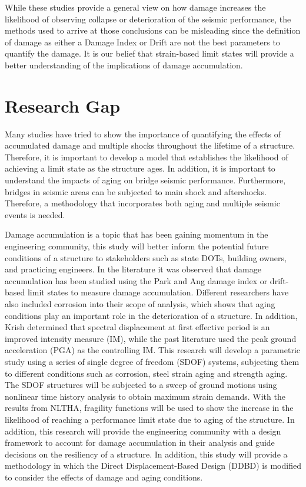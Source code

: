 While these studies provide a general view on how damage increases the likelihood of observing collapse or deterioration of the seismic performance, the methods used to arrive at those conclusions can be misleading since the definition of damage as either a Damage Index or Drift are not the best parameters to quantify the damage. It is our belief that strain-based limit states will provide a better understanding of the implications of damage accumulation.

\section{Research Gap}

Many studies have tried to show the importance of quantifying the effects of accumulated damage and multiple shocks throughout the lifetime of a structure.  Therefore, it is important to develop a model that establishes the likelihood of achieving a limit state as the structure ages. In addition,  it is important to understand the impacts of aging on bridge seismic performance. Furthermore, bridges in seismic areas can be subjected to main shock and aftershocks. Therefore, a methodology that incorporates both aging and multiple seismic events is needed.

Damage accumulation is a topic that has been gaining momentum in the engineering community, this study will better inform  the potential future conditions of a structure to stakeholders such as state DOTs, building owners, and practicing engineers. In the literature it was observed that damage accumulation has been studied using the Park and Ang damage index or drift-based limit states to measure damage accumulation. Different researchers have also included corrosion into their scope of analysis, which shows that aging conditions play an important role in the deterioration of a structure. In addition, Krish \cite{Krish2018} determined that spectral displacement at first effective period is an improved intensity measure (IM), while the past literature used the peak ground acceleration (PGA) as the controlling IM. This research will develop a parametric study using a series of single degree of freedom (SDOF) systems, subjecting them to different conditions such as corrosion, steel strain aging and strength aging. The SDOF structures will be subjected to a sweep of ground motions using nonlinear time history analysis to obtain maximum strain demands. With the results from NLTHA, fragility functions will be used to show the increase in the likelihood of reaching a performance limit state due to aging of the structure. In addition, this research will provide the engineering community with a design framework to account for damage accumulation in their analysis and guide decisions on the resiliency of a structure. In addition, this study will provide a methodology in which the Direct Displacement-Based Design (DDBD) is modified to consider the effects of damage and aging conditions.

